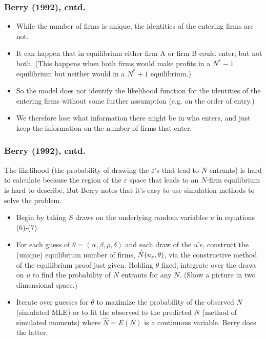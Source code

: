 \documentclass[aspectratio=169,11pt]{beamer}
\begin{document}
\begin{frame}
\frametitle{Berry (1992), cntd.}
\begin{itemize}
\item While the number of firms is unique, the identities of the entering
firms are not.

\item It can happen that in equilibrium either firm A or firm B could enter,
but not both. (This happens when both firms would make profits in a $N^{\ast
}-1$ equilibrium but neither would in a $N^{\ast }+1$ equilibrium.)

\item So the model does not identify the likelihood function for the
identities of the entering firms without some further assumption (e.g. on
the order of entry.)

\item We therefore lose what information there might be in who enters, and
just keep the information on the number of firms that enter.
\end{itemize}

\end{frame}

\begin{frame}
\frametitle{Berry (1992), cntd.}
\footnotesize
The likelihood (the probability of drawing the $\varepsilon $'s that lead to 
$N$ entrants) is hard to calculate because the region of the $\varepsilon $
space that leads to an $N$-firm equilibrium is hard to describe. But Berry
notes that it's easy to use simulation methods to solve the problem.
\begin{itemize}
\item Begin by taking $S$ draws on the underlying random variables $u$ in
equations (6)-(7).
\item For each guess of $\theta =(\alpha ,\beta ,\rho ,\delta )$ and each
draw of the $u$'s, construct the (unique) equilibrium number of firms, $\hat{%
N}(u_{s},\theta )$, via the constructive method of the equilibrium proof
just given. Holding $\theta $ fixed, integrate over the draws on $u$ to find
the probability of $N$ entrants for any $N$. (Show a picture in two
dimensional space.)
\item Iterate over guesses for $\theta $ to maximize the probability of the
observed $N$ (simulated MLE) or to fit the observed to the predicted $N$
(method of simulated moments) where $\hat{N}=E(N)$ is a continuous variable.
Berry does the latter.
\end{itemize}
\end{frame}
\end{document}
